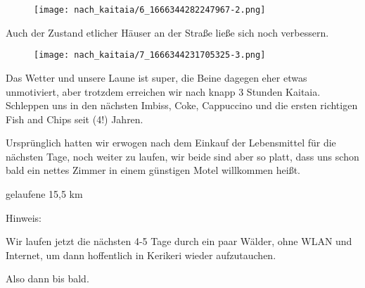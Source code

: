 \begin{figure}[H]
	\centering
	\texttt{[image: nach\_kaitaia/6\_1666344282247967-2.png]}
	\caption{}
	\label{fig:6_1666344282247967-2}
\end{figure}

  Auch der Zustand etlicher Häuser an der Straße ließe sich noch verbessern.
 


\begin{figure}[H]
	\centering
	\texttt{[image: nach\_kaitaia/7\_1666344231705325-3.png]}
	\caption{}
	\label{fig:7_1666344231705325-3}
\end{figure}

  Das Wetter und unsere Laune ist super, die Beine dagegen eher etwas unmotiviert, aber trotzdem erreichen wir nach knapp 3 Stunden Kaitaia. Schleppen uns in den nächsten Imbiss, Coke, Cappuccino und die ersten richtigen Fish and Chips seit (4!) Jahren.
 


  Ursprünglich hatten wir erwogen nach dem Einkauf der Lebensmittel für die nächsten Tage, noch weiter zu laufen, wir beide sind aber so platt, dass uns schon bald ein nettes Zimmer in einem günstigen Motel willkommen heißt.
 


  gelaufene 15,5 km
 


  Hinweis:
 


  Wir laufen jetzt die nächsten 4-5 Tage durch ein paar Wälder, ohne WLAN und Internet, um dann hoffentlich in Kerikeri wieder aufzutauchen.
 


  Also dann bis bald. ️
 


